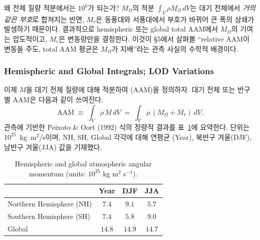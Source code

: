 \begin{hisublock}
왜 전체 질량 적분에서는 $10^6$가 되는가?  $M_\Omega$의 적분 $\int_V \rho M_\Omega\,dV$는
대기 전체에서 \emph{거의 같은 부호}로 합쳐지는 반면, $M_r$은 동풍대와 서풍대에서
부호가 바뀌어 큰 폭의 상쇄가 발생하기 때문이다.  결과적으로 hemispheric 또는 global
total AAM에서 $M_\Omega$의 기여는 압도적이고, $M_r$은 변동량만을 결정한다.
이것이 \S5에서 살펴볼 ``relative AAM이 변동을 주도, total AAM 평균은 $M_\Omega$가
지배''라는 관측 사실의 수학적 배경이다.
\end{hisublock}

\subsubsection{Hemispheric and Global Integrals; LOD Variations}

이제 $M$을 대기 전체 질량에 대해 적분하여 
(AAM)을 정의하자.  대기 전체 또는 반구별 AAM은 다음과 같이 쓰여진다.
\begin{equation}\label{eq:ch07_am_AAM_def}
  \text{AAM} \;\equiv\; \int_V \rho\,M\,dV
   \;=\; \int_V \rho\,(M_\Omega + M_r)\,dV.
\end{equation}
관측에 기반한 Peixoto \& Oort (1992) 식의 정량적 결과를 표~\ref{tab:ch07_am_hemispheric}에
요약한다.  단위는 $10^{25}$~kg~m$^2$/s이며, NH, SH, Global 각각에 대해 연평균 (Year),
북반구 겨울(DJF), 남반구 겨울(JJA) 값을 기재했다.

\begin{table}[ht]
  \centering
  \begin{tabular}{l|ccc}
    \hline
     & Year & DJF & JJA \\\hline
    Northern Hemisphere (NH) & $7.4$ & $9.1$ & $5.7$ \\
    Southern Hemisphere (SH) & $7.4$ & $5.8$ & $9.0$ \\
    Global                    & $14.8$ & $14.9$ & $14.7$ \\\hline
  \end{tabular}
  \caption{Hemispheric and global atmospheric angular momentum (units:
  $10^{25}$ kg m$^2$ s$^{-1}$). }
  \label{tab:ch07_am_hemispheric}
\end{table}


